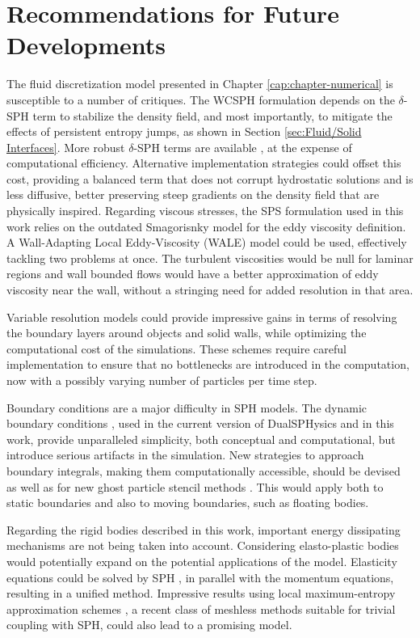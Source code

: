 \section{Recommendations for Future Developments}

The fluid discretization model presented in Chapter \ref{cap:chapter-numerical} is susceptible to a number of critiques. The \ac{WCSPH} formulation depends on the $\delta$-SPH term to stabilize the density field, and most importantly, to mitigate the effects of persistent entropy jumps, as shown in Section \ref{sec:Fluid/Solid Interfaces}. More robust $\delta$-SPH terms are available \citep{Antuono-2012}, at the expense of computational efficiency. Alternative implementation strategies could offset this cost, providing a balanced term that does not corrupt hydrostatic solutions and is less diffusive, better preserving steep gradients on the density field that are physically inspired. Regarding viscous stresses, the \ac{SPS} formulation used in this work relies on the outdated Smagorisnky model for the eddy viscosity definition. A Wall-Adapting Local Eddy-Viscosity (WALE) model could be used, effectively tackling two problems at once. The turbulent viscosities would be null for laminar regions and wall bounded flows would have a better approximation of eddy viscosity near the wall, without a stringing need for added resolution in that area. 

Variable resolution models \citep{Vacondio-2013} could provide impressive gains in terms of resolving the boundary layers around objects and solid walls, while optimizing the computational cost of the simulations. These schemes require careful implementation to ensure that no bottlenecks are introduced in the computation, now with a possibly varying number of particles per time step.

Boundary conditions are a major difficulty in \ac{SPH} models. The dynamic boundary conditions \citep{Crespo-2007}, used in the current version of DualSPHysics and in this work, provide unparalleled simplicity, both conceptual and computational, but introduce serious artifacts in the simulation. New strategies to approach boundary integrals, making them computationally accessible, should be devised as well as for new ghost particle stencil methods \citep{Fourtakas-2014}.  This would apply both to static boundaries and also to moving boundaries, such as floating bodies.

Regarding the rigid bodies described in this work, important energy dissipating mechanisms are not being taken into account. Considering elasto-plastic bodies would potentially expand on the potential applications of the model. Elasticity equations could be solved by SPH \citep{Cleary-2008}, in parallel with the momentum equations, resulting in a unified method. Impressive results using local maximum-entropy approximation schemes \citep{Arroyo-2006, Ortiz-2010}, a recent class of meshless methods suitable for trivial coupling with SPH, could also lead to a promising model.

